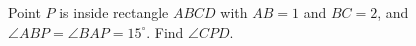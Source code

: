Point $P$ is inside rectangle $ABCD$ with $AB=1$ and $BC=2$, and $\angle ABP=\angle BAP=15^\circ$. Find $\angle CPD$.

